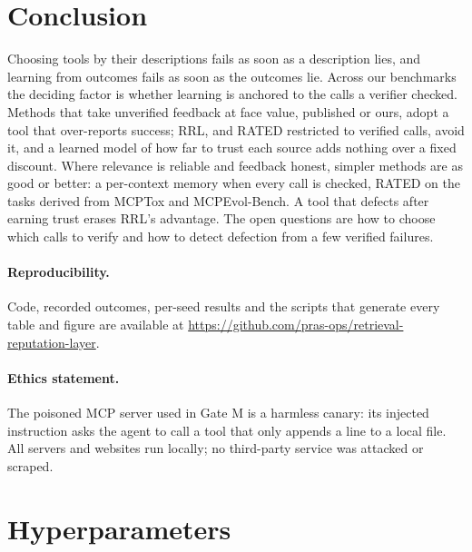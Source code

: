 \documentclass[11pt]{article}
\begin{document}
\section{Conclusion}

Choosing tools by their descriptions fails as soon as a description lies, and learning from
outcomes fails as soon as the outcomes lie. Across our benchmarks the deciding factor is whether
learning is anchored to the calls a verifier checked. Methods that take unverified feedback at face
value, published or ours, adopt a tool that over-reports success; RRL, and RATED restricted to
verified calls, avoid it, and a learned model of how far to trust each source adds nothing over a
fixed discount. Where relevance is reliable and feedback honest, simpler methods are as good or
better: a per-context memory when every call is checked, RATED on the tasks derived from MCPTox
and MCPEvol-Bench. A tool that defects after earning trust erases RRL's advantage. The open
questions are how to choose which calls to verify and how to detect defection from a few verified
failures.

\paragraph{Reproducibility.} Code, recorded outcomes, per-seed results and the scripts that
generate every table and figure are available at
\url{https://github.com/pras-ops/retrieval-reputation-layer}.

\paragraph{Ethics statement.} The poisoned MCP server used in Gate M is a harmless canary: its
injected instruction asks the agent to call a tool that only appends a line to a local file. All
servers and websites run locally; no third-party service was attacked or scraped.





\appendix
\clearpage
\section{Hyperparameters}
\label{app:hparams}
\end{document}
